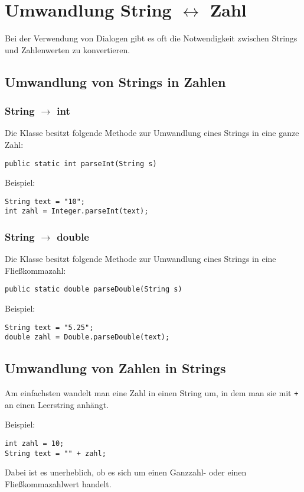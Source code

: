 \section{Umwandlung String $\leftrightarrow$ Zahl}

Bei der Verwendung von Dialogen gibt es oft die Notwendigkeit zwischen Strings
und Zahlenwerten zu konvertieren.

\subsection{Umwandlung von Strings in Zahlen}

\subsubsection{String $\rightarrow$ int}

Die Klasse  besitzt folgende Methode zur Umwandlung eines
Strings in eine ganze Zahl:

\begin{lstlisting}
public static int parseInt(String s)
\end{lstlisting}

Beispiel:

\begin{lstlisting}
String text = "10";
int zahl = Integer.parseInt(text);
\end{lstlisting}


\subsubsection{String $\rightarrow$ double}

Die Klasse  besitzt folgende Methode zur Umwandlung eines
Strings in eine Fließkommazahl:

\begin{lstlisting}
public static double parseDouble(String s)
\end{lstlisting}

Beispiel:

\begin{lstlisting}
String text = "5.25";
double zahl = Double.parseDouble(text);
\end{lstlisting}


\subsection{Umwandlung von Zahlen in Strings}

Am einfachsten wandelt man eine Zahl in einen String um, in dem man sie mit
\verb|+| an einen Leerstring anhängt.

Beispiel:

\begin{lstlisting}
int zahl = 10;
String text = "" + zahl;
\end{lstlisting}

Dabei ist es unerheblich, ob es sich um einen Ganzzahl- oder einen
Fließkommazahlwert handelt.
